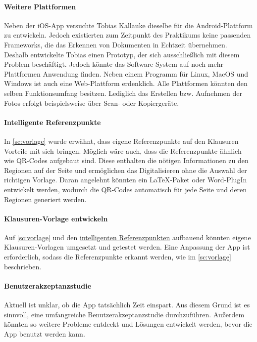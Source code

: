 \documentclass[notables, nomenclature, oneside, 150]{HSMW-Thesis}
\begin{document}
	\paragraph*{Weitere Plattformen} 
		Neben der iOS-App versuchte Tobias Kallauke dieselbe für die Android-Plattform zu entwickeln. Jedoch existierten zum Zeitpunkt des Praktikums keine passenden Frameworks, die das Erkennen von Dokumenten in Echtzeit übernehmen. Deshalb entwickelte Tobias einen Prototyp, der sich ausschließlich mit diesem Problem beschäftigt. Jedoch könnte das Software-System auf noch mehr Plattformen Anwendung finden. Neben einem Programm für Linux, MacOS und Windows ist auch eine Web-Plattform erdenklich. Alle Plattformen könnten den selben Funktionsumfang besitzen. Lediglich das Erstellen bzw. Aufnehmen der Fotos erfolgt beispielsweise über Scan- oder Kopiergeräte.
	
	\paragraph*{Intelligente Referenzpunkte}\label{pa:referenzpunkte}
		In \autoref{sc:vorlage} wurde erwähnt, dass eigene Referenzpunkte auf den Klausuren Vorteile mit sich bringen. Möglich wäre auch, dass die Referenzpunkte ähnlich wie QR-Codes aufgebaut sind. Diese enthalten die nötigen Informationen zu den Regionen auf der Seite und ermöglichen das Digitalisieren ohne die Auswahl der richtigen Vorlage. Daran angelehnt könnten ein \LaTeX -Paket oder Word-PlugIn entwickelt werden, wodurch die QR-Codes automatisch für jede Seite und deren Regionen generiert werden. 
	
	\paragraph*{Klausuren-Vorlage entwickeln}
		Auf \autoref{sc:vorlage} und den \hyperref[pa:referenzpunkte]{intelligenten Referenzpunkten} aufbauend könnten eigene Klausuren-Vorlagen umgesetzt und getestet werden. Eine Anpassung der App ist erforderlich, sodass die Referenzpunkte erkannt werden, wie im \autoref{sc:vorlage} beschrieben.
		
	\paragraph*{Benutzerakzeptanzstudie}\label{pa:akzeptanz}
		Aktuell ist unklar, ob die App tatsächlich Zeit einspart. Aus diesem Grund ist es sinnvoll, eine umfangreiche Benutzerakzeptanzstudie durchzuführen. Außerdem könnten so weitere Probleme entdeckt und Lösungen entwickelt werden, bevor die App benutzt werden kann.
	
\end{document}
